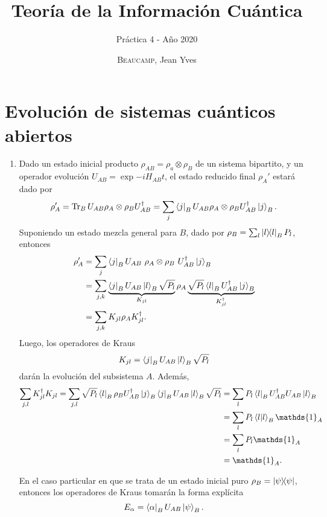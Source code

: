 \documentclass{scrartcl}
\title{Teoría de la Información Cuántica}
\subtitle{Práctica 4 - Año 2020}
\author{\textsc{Beaucamp}, Jean Yves}
\date{}
\DeclareRobustCommand{\[}{\begin{equation}}
\DeclareRobustCommand{\]}{\end{equation}}
\begin{document}
\maketitle

\section{Evolución de sistemas cuánticos abiertos}
\begin{enumerate}
    
    \item Dado un estado inicial producto $\rho_{AB} = \rho_a \otimes \rho_B$ de un sistema bipartito, y un operador evolución $U_{AB} = \exp{-iH_{AB} t}$, el estado reducido final $\rho_A'$ estará dado por
    \[ \rho_A' = \Tr_B U_{AB} \rho_A \otimes \rho_B U_{AB}^\dagger = \sum_j \bra{j}_B U_{AB} \rho_A \otimes \rho_B U_{AB}^\dagger \ket{j}_B. \]
    Suponiendo un estado mezcla general para $B$, dado por $\rho_B = \sum_l \dyad{l}{l}_B P_l$, entonces
    \begin{align}
        \rho_A' &= \sum_j \bra{j}_B U_{AB} \ \rho_A \otimes \rho_B \ U_{AB}^\dagger \ket{j}_B \\
        &= \sum_{j, k} \underbrace{\bra{j}_B U_{AB} \ket{l}_B \sqrt{P_l}}_{K_{jl}} \rho_A \underbrace{\sqrt{P_l} \bra{l}_B U_{AB}^\dagger \ket{j}_B}_{K_{jl}^\dagger} \\
        &= \sum_{j, k} K_{jl} \rho_A K_{jl}^\dagger.
    \end{align}
    Luego, los operadores de Kraus
    \[ K_{jl} = \bra{j}_B U_{AB} \ket{l}_B \sqrt{P_l} \label{eq:I_1_1} \]
    darán la evolución del subsistema $A$. Además,
    \begin{align}
        \sum_{j,l} K_{jl}^\dagger K_{jl} = \sum_{j, l} \sqrt{P_l} \bra{l}_B \rho_B U_{AB}^\dagger \ket{j}_B \bra{j}_B U_{AB} \ket{l}_B \sqrt{P_l} &= \sum_{l} P_l \bra{l}_B U_{AB}^\dagger U_{AB} \ket{l}_B \\
            &= \sum_{l} P_l \ip{l}{l}_B \mathds{1}_A \\
            &= \sum_{l} P_l \mathds{1}_A \\
            &= \mathds{1}_A.
    \end{align}
    
    En el caso particular en que se trata de un estado inicial puro $\rho_B = \dyad{\psi}{\psi}$, entonces los operadores de Kraus tomarán la forma explícita
    \[ E_\alpha = \bra{\alpha}_B U_{AB} \ket{\psi}_B. \]
    

\end{enumerate}
\end{document}
